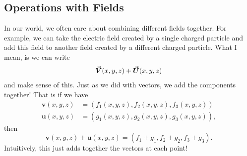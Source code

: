         \subsection{Operations with Fields}
        In our world, we often care about combining different fields together.  For example, we can take the electric field created by a single charged particle and add this field to another field created by a different charged particle. What I mean, is we can write
        \[
        \boldsymbol{\vec{V}}(x,y,z)+\boldsymbol{\vec{U}}(x,y,z)
        \]
        and make sense of this.  Just as we did with vectors, we add the components together! That is if we have
        \begin{align*}
        \mathbf{v}(x,y,z)&=(f_1(x,y,z),f_2(x,y,z),f_3(x,y,z))\\ \mathbf{u}(x,y,z)&=(g_1(x,y,z),g_2(x,y,z),g_3(x,y,z)),
        \end{align*}
        then
        \[
        \mathbf{v}(x,y,z)+\mathbf{u}(x,y,z)=(f_1+g_1,f_2+g_2,f_3+g_3).
        \]
        Intuitively, this just adds together the vectors at each point!
        
